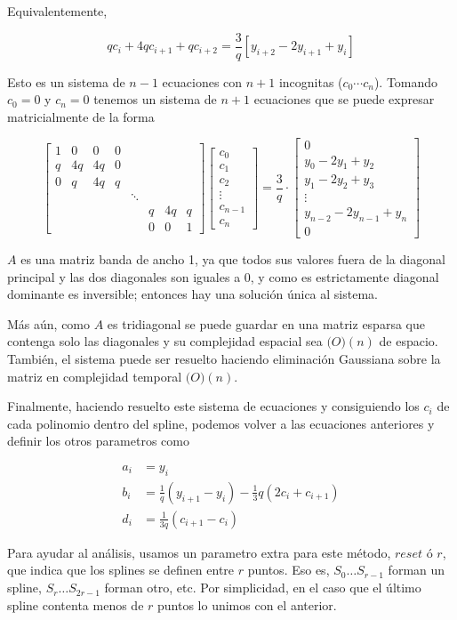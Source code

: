 Equivalentemente,

\[
q c_i + 4 q c_{i + 1} + q c_{i + 2} = \frac{3}{q} \left[ y_{i + 2} - 2 y_{i + 1} + y_i \right]
\]

Esto es un sistema de $n - 1$ ecuaciones con $n + 1$ incognitas ($c_0 \cdots
c_n$). Tomando $c_0 = 0$ y $c_n = 0$ tenemos un sistema de $n + 1$ ecuaciones
que se puede expresar matricialmente de la forma

\[
\begin{bmatrix}
1 & 0 & 0 & 0 \\
q & 4 q & 4 q & 0 \\
0 & q & 4 q & q \\
&&&& \ddots \\
&&&&& q & 4 q & q \\
&&&&& 0 & 0 & 1
\end{bmatrix}
\begin{bmatrix}
c_0 \\
c_1 \\
c_2 \\
\vdots \\
c_{n - 1} \\
c_n
\end{bmatrix}
=
\frac{3}{q} \cdot \begin{bmatrix}
0 \\
y_0 - 2 y_1 + y_2 \\
y_1 - 2 y_2 + y_3 \\
\vdots \\
y_{n - 2} - 2 y_{n - 1} + y_n \\
0
\end{bmatrix}
\]

$A$ es una matriz banda de ancho 1, ya que todos sus valores fuera de la
diagonal principal y las dos diagonales son iguales a $0$, y como es
estrictamente diagonal dominante es inversible; entonces hay una soluci\'on
\'unica al sistema.

M\'as a\'un, como $A$ es tridiagonal se puede guardar en una matriz esparsa que
contenga solo las diagonales y su complejidad espacial sea $\mathbb(O)(n)$ de
espacio. Tambi\'en, el sistema puede ser resuelto haciendo eliminaci\'on
Gaussiana sobre la matriz en complejidad temporal $\mathbb(O)(n)$.

Finalmente, haciendo resuelto este sistema de ecuaciones y consiguiendo los
$c_i$ de cada polinomio dentro del spline, podemos volver a las ecuaciones
anteriores y definir los otros parametros como

\[
\begin{split}
a_i & = y_i \\
b_i & = \frac{1}{q} (y_{i + 1} - y_i) - \frac{1}{3} q (2 c_i + c_{i + 1}) \\
d_i & = \frac{1}{3 q} (c_{i + 1} - c_i)
\end{split}
\]

Para ayudar al an\'alisis, usamos un parametro extra para este m\'etodo,
$reset$ \'o $r$, que indica que los splines se definen entre $r$ puntos. Eso es,
$S_0 \ldots S_{r - 1}$ forman un spline, $S_r \ldots S_{2r - 1}$ forman otro,
etc. Por simplicidad, en el caso que el \'ultimo spline contenta menos de $r$
puntos lo unimos con el anterior.

